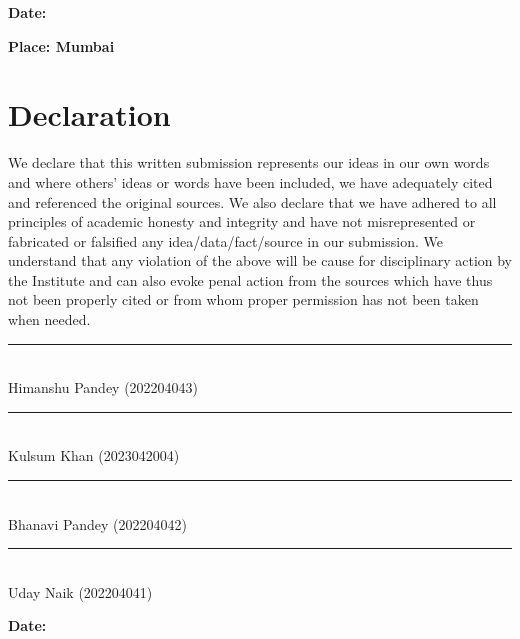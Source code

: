\documentclass[12pt]{article}
\begin{document}
\vfill
\noindent
\textbf{Date:} \par
\vspace{0.5cm}
\noindent
\textbf{Place: Mumbai}
\thispagestyle{empty} 

\newpage
\section*{Declaration}
\vspace{1.5cm}
\noindent
We declare that this written submission represents our ideas in our own words and where others' ideas or words have been included, we have adequately cited and referenced the original sources. We also declare that we have adhered to all principles of academic honesty and integrity and have not misrepresented or fabricated or falsified any idea/data/fact/source in our submission. We understand that any violation of the above will be cause for disciplinary action by the Institute and can also evoke penal action from the sources which have thus not been properly cited or from whom proper permission has not been taken when needed.

\vspace{3cm}
\begin{flushright}
    \parbox{7cm}{
    \centering
    \vspace{1cm}
    \rule{7cm}{0.4pt} \\
    \vspace{0.1cm}
    Himanshu Pandey (202204043)\\[1.5cm]

    \vspace{1cm}
    \rule{7cm}{0.4pt} \\
    \vspace{0.1cm}
    Kulsum Khan (2023042004)\\[1.5cm]

    \vspace{1cm}
    \rule{7cm}{0.4pt} \\
    \vspace{0.1cm}
    Bhanavi Pandey (202204042)\\[1.5cm]
    
    \vspace{1cm}
    \rule{7cm}{0.4pt} \\
    \vspace{0.1cm}
    Uday Naik (202204041)\\[1.5cm]
    }
\end{flushright}

\vfill
\noindent
\textbf{Date:}
\vspace{4cm}
\thispagestyle{empty}
\end{document}
